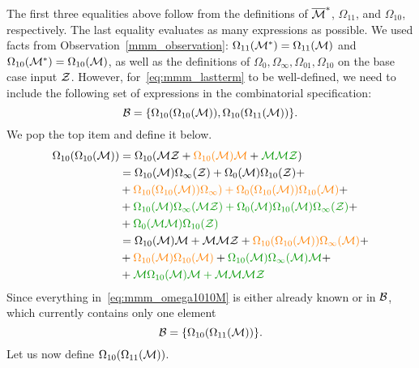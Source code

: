 \documentclass[12pt, a4paper, twoside]{report}
\begin{document}
The first three equalities above follow from the definitions of $\overline{\mathcal{M}}^*$, $\Omega_{11}$, and $\Omega_{10}$, respectively. The last equality evaluates as many expressions as possible. We used facts from Observation~\ref{mmm_observation}: $\Omega_{11}(\mathcal{M}^*) = \Omega_{11}(\mathcal{M})$ and $\Omega_{10}(\mathcal{M}^*)=\Omega_{10}(\mathcal{M})$, as well as the definitions of $\Omega_0, \Omega_\infty, \Omega_{01}, \Omega_{10}$ on the base case input $\mathcal{Z}$. However, for~\eqref{eq:mmm_lastterm} to be well-defined, we need to include the following set of expressions in the combinatorial specification: $$\mathcal{B} = \{\Omega_{10}(\Omega_{10}(\mathcal{M})), \Omega_{10}(\Omega_{11}(\mathcal{M}))\}.$$
We pop the top item and define it below.
\begin{align}
  \begin{aligned}
    \Omega_{10}(\Omega_{10}(\M)) &= \Omega_{10}(\M\Z + \textcolor{orange}{\Omega_{10}(\M)\M} + \textcolor{green}{\M\M\Z})\\
    &= \Omega_{10}(\M)\Omega_\infty(\Z) + \Omega_0(\M)\Omega_{10}(\Z) +\\
    &+ \textcolor{orange}{\Omega_{10}(\Omega_{10}(\M))\Omega_\infty) + \Omega_0(\Omega_{10}(\M))\Omega_{10}(\M)} +\\
    &+ \textcolor{green}{\Omega_{10}(\M)\Omega_\infty(\M\Z) + \Omega_0(\M)\Omega_{10}(\M)\Omega_\infty(\Z)} +\\
    &+ \textcolor{green}{\Omega_0(\M\M)\Omega_{10}(\Z)}\\
    &= \Omega_{10}(\M)\M + \M\M\Z + \textcolor{orange}{\Omega_{10}(\Omega_{10}(\M))\Omega_\infty(\M)} +\\
    &+ \textcolor{orange}{\Omega_{10}(\M)\Omega_{10}(\M)} + \textcolor{green}{\Omega_{10}(\M)\Omega_\infty(\M)\M} +\\
    &+ \textcolor{green}{\M\Omega_{10}(\M)\M + \M\M\M\Z}
  \end{aligned}
      \label{eq:mmm_omega1010M}
\end{align}
Since everything in~\eqref{eq:mmm_omega1010M} is either already known or in $\mathcal{B}$, which currently contains only one element
$$\mathcal{B} = \{\Omega_{10}(\Omega_{11}(\mathcal{M}))\}.$$
Let us now define $\Omega_{10}(\Omega_{11}(\mathcal{M}))$. 
\end{document}
